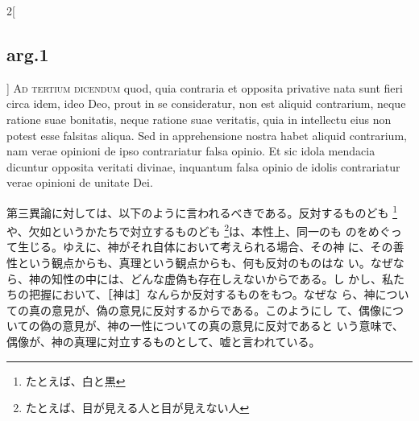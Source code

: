 \documentclass[paper=a4paper,fontsize=10pt,jafontsize=9pt,titlepage]{jlreq}
\begin{document}
\begin{paracol}{2}[\subsection{arg.1}]
{\scshape Ad tertium dicendum} quod, quia contraria et opposita
 privative nata sunt fieri circa idem, ideo Deo, prout in se
 consideratur, non est aliquid contrarium, neque ratione suae
 bonitatis, neque ratione suae veritatis, quia in intellectu eius non
 potest esse falsitas aliqua. Sed in apprehensione nostra habet
 aliquid contrarium, nam verae opinioni de ipso contrariatur falsa
 opinio. Et sic idola mendacia dicuntur opposita veritati divinae,
 inquantum falsa opinio de idolis contrariatur verae opinioni de
 unitate Dei.

\switchcolumn

第三異論に対しては、以下のように言われるべきである。反対するものども
\footnote{たとえば、白と黒}や、欠如というかたちで対立するものども
\footnote{たとえば、目が見える人と目が見えない人}は、本性上、同一のも
のをめぐって生じる。ゆえに、神がそれ自体において考えられる場合、その神
に、その善性という観点からも、真理という観点からも、何も反対のものはな
い。なぜなら、神の知性の中には、どんな虚偽も存在しえないからである。し
かし、私たちの把握において、［神は］なんらか反対するものをもつ。なぜな
ら、神についての真の意見が、偽の意見に反対するからである。このようにし
て、偶像についての偽の意見が、神の一性についての真の意見に反対であると
いう意味で、偶像が、神の真理に対立するものとして、嘘と言われている。

\end{paracol}
\end{document}
